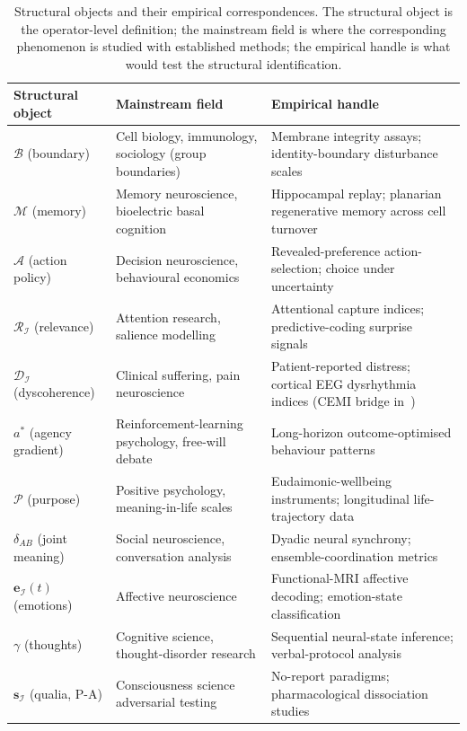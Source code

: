 \documentclass[11pt]{article}
\theoremstyle{plain}
\theoremstyle{definition}
\theoremstyle{remark}
\newcommand{\Ical}{\mathcal{I}}
\newcommand{\Mcal}{\mathcal{M}}
\newcommand{\Acal}{\mathcal{A}}
\newcommand{\Bcal}{\mathcal{B}}
\newcommand{\Rcal}{\mathcal{R}}
\newcommand{\Dcal}{\mathcal{D}}
\newcommand{\Pcal}{\mathcal{P}}
\begin{document}
\begin{table}[h]
\centering
\small
\caption{Structural objects and their empirical correspondences. The structural object is the operator-level definition; the mainstream field is where the corresponding phenomenon is studied with established methods; the empirical handle is what would test the structural identification.}\label{tab:empirical-anchors}
\begin{tabular}{p{2.6cm}p{3.2cm}p{6.4cm}}
\toprule
Structural object & Mainstream field & Empirical handle \\
\midrule
$\Bcal$ (boundary) & Cell biology, immunology, sociology (group boundaries) & Membrane integrity assays; identity-boundary disturbance scales \\
$\Mcal$ (memory) & Memory neuroscience, bioelectric basal cognition~\citep{LevinBasalCognition} & Hippocampal replay; planarian regenerative memory across cell turnover \\
$\Acal$ (action policy) & Decision neuroscience, behavioural economics & Revealed-preference action-selection; choice under uncertainty \\
$\Rcal_\Ical$ (relevance) & Attention research, salience modelling & Attentional capture indices; predictive-coding surprise signals~\citep{FristonFreeEnergy} \\
$\Dcal_\Ical$ (dyscoherence) & Clinical suffering, pain neuroscience & Patient-reported distress; cortical EEG dysrhythmia indices (CEMI bridge in~\citet{SmartProcessingToPOV}) \\
$a^*$ (agency gradient) & Reinforcement-learning psychology, free-will debate & Long-horizon outcome-optimised behaviour patterns \\
$\Pcal$ (purpose) & Positive psychology, meaning-in-life scales & Eudaimonic-wellbeing instruments; longitudinal life-trajectory data \\
$\delta_{AB}$ (joint meaning) & Social neuroscience, conversation analysis & Dyadic neural synchrony; ensemble-coordination metrics \\
$\mathbf{e}_\Ical(t)$ (emotions) & Affective neuroscience & Functional-MRI affective decoding; emotion-state classification \\
$\gamma$ (thoughts) & Cognitive science, thought-disorder research & Sequential neural-state inference; verbal-protocol analysis \\
$\mathbf{s}_\Ical$ (qualia, P-A) & Consciousness science adversarial testing~\citep{ConsciousnessAdversarial} & No-report paradigms; pharmacological dissociation studies \\

\end{tabular}
\end{table}
\end{document}
